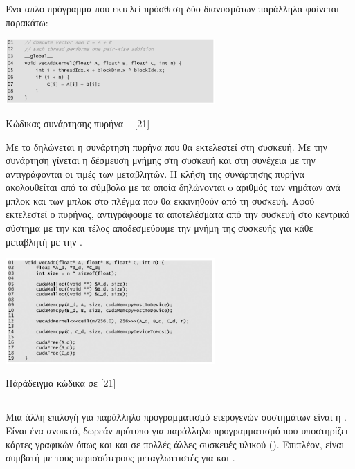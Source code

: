 Ένα απλό πρόγραμμα  που εκτελεί πρόσθεση δύο διανυσμάτων παράλληλα φαίνεται παρακάτω:
 
\begin{Illustration}[!h] 
	\centering
	\includegraphics[width=0.6\textwidth]{images/image053.png} 
	\caption{Κώδικας συνάρτησης πυρήνα –  [21]}
	\label{image-3.10}
\end{Illustration}


Με το  δηλώνεται η συνάρτηση πυρήνα που θα εκτελεστεί στη συσκευή.
Με την συνάρτηση  γίνεται η δέσμευση μνήμης στη συσκευή και στη συνέχεια με την  αντιγράφονται οι τιμές των μεταβλητών. Η κλήση της συνάρτησης πυρήνα ακολουθείται από τα σύμβολα \mbox{} με τα οποία δηλώνονται o αριθμός των νημάτων ανά μπλοκ και των μπλοκ στο πλέγμα που θα εκκινηθούν από τη συσκευή. Αφού εκτελεστεί ο πυρήνας, αντιγράφουμε τα αποτελέσματα από την συσκευή στο κεντρικό σύστημα με την  και τέλος αποδεσμεύουμε την μνήμη της συσκευής για κάθε μεταβλητή με την . 
 
\begin{Illustration}[!h] 
	\centering
	\includegraphics[width=0.6\textwidth]{images/image054.png} 
	\caption{Πάράδειγμα κώδικα σε  [21]}
	\label{image-3.11}
\end{Illustration}

\subsection{}

Μια άλλη επιλογή για παράλληλο προγραμματισμό ετερογενών συστημάτων είναι η . Είναι ένα ανοικτό, δωρεάν πρότυπο για παράλληλο προγραμματισμό που υποστηρίζει κάρτες γραφικών όπως  και  και σε πολλές άλλες συσκευές υλικού (). Επιπλέον, είναι συμβατή με τους περισσότερους μεταγλωττιστές για  και . 

